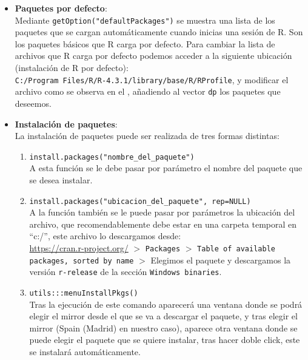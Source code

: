 \documentclass[12pt]{report}\usepackage[]{graphicx}\usepackage[dvipsnames]{xcolor}
\begin{document}
			\begin{itemize}
				\item \textbf{Paquetes por defecto}: \\
				Mediante \texttt{getOption("defaultPackages")} se muestra una lista de los paquetes que se cargan automáticamente cuando inicias una sesión de R. Son los paquetes básicos que R carga por defecto. Para cambiar la lista de archivos que R carga por defecto podemos acceder a la siguiente ubicación (instalación de R por defecto):\\\texttt{C:/Program Files/R/R-4.3.1/library/base/R/RProfile}, y modificar el archivo como se observa en el , añadiendo al vector \texttt{dp} los paquetes que deseemos. 
				
				
				
				\item \textbf{Instalación de paquetes}: \\
				La instalación de paquetes puede ser realizada de tres formas distintas:
				
				\begin{enumerate}[label = \textbf{\arabic*. }]
					\item \texttt{install.packages("nombre\_del\_paquete")}\\
					A esta función se le debe pasar por parámetro el nombre del paquete que se desea instalar.
					
					\item \texttt{install.packages("ubicacion\_del\_paquete", rep=NULL)}\\
					A la función también se le puede pasar por parámetros la ubicación del archivo, que recomendablemente debe estar en una carpeta temporal en ``c:/'', este archivo lo descargamos desde:\\ \url{https://cran.r-project.org/} $>$ \texttt{Packages} $>$ \texttt{Table of available packages, sorted by name} $>$ Elegimos el paquete y descargamos la versión \texttt{r-release} de la sección \texttt{Windows binaries}.
					
					\item \texttt{utils:::menuInstallPkgs()}\\
					Tras la ejecución de este comando aparecerá una ventana donde se podrá elegir el mirror desde el que se va a descargar el paquete, y tras elegir el mirror (Spain (Madrid) en nuestro caso), aparece otra ventana donde se puede elegir el paquete que se quiere instalar, tras hacer doble click, este se instalará automáticamente.
				\end{enumerate}
				

\end{itemize}
\end{document}
